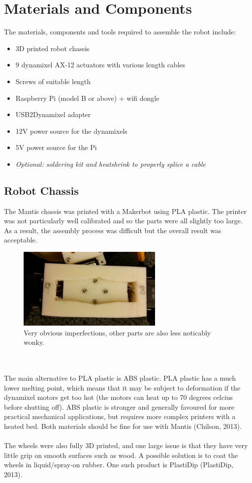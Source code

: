 \documentclass[]{article}
\begin{document}
\section{Materials and Components}
The materials, components and tools required to assemble the robot include:
\begin{itemize}
  \item 3D printed robot chassis
  \item 9 dynamixel AX-12 actuators with various length cables
  \item Screws of suitable length
  \item Raspberry Pi (model B or above) + wifi dongle
  \item USB2Dynamixel adapter
  \item 12V power source for the dynamixels
  \item 5V power source for the Pi
  \item \textit{Optional: soldering kit and heatshrink to properly splice a cable}
\end{itemize}
\subsection{Robot Chassis}
The Mantis chassis was printed with a Makerbot using PLA plastic. The printer was not particularly well calibrated and so the parts were all slightly too large. As a result, the assembly process was difficult but the overall result was acceptable.
\begin{figure}[h]
\centering
\includegraphics[width=200pt]{report_images/plastic_imperfection.jpg}
\caption{Very obvious imperfections, other parts are also less noticably wonky.}
\end{figure}
\\
\\
The main alternative to PLA plastic is ABS plastic. PLA plastic has a much lower melting point, which means that it may be subject to deformation if the dynamixel motors get too hot (the motors can heat up to 70 degrees celcius before shutting off). ABS plastic is stronger and generally favoured for more practical mechanical applications, but requires more complex printers with a heated bed. Both materials should be fine for use with Mantis (Chilson, 2013).
\\
\\
The wheels were also fully 3D printed, and one large issue is that they have very little grip on smooth surfaces such as wood. A possible solution is to coat the wheels in liquid/spray-on rubber. One such product is PlastiDip (PlastiDip, 2013).
\end{document}

